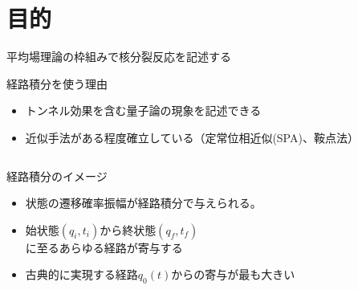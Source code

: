 \documentclass[14pt,aspectratio=169,xcolor=dvipsnames,table,dvipdfmx]{beamer}
\theoremstyle{definition}
\begin{document}
\section{目的}
\begin{frame}{平均場理論の枠組みで核分裂反応を記述する}
  \begin{block}{経路積分を使う理由}
    \begin{itemize}
      \item トンネル効果を含む量子論の現象を記述できる
      \item 近似手法がある程度確立している（定常位相近似(SPA)、鞍点法）
    \end{itemize}
  \end{block}
  \begin{columns}[t]
    \begin{column}{.53\textwidth}
      \vspace{-5mm}
      \begin{exampleblock}{経路積分のイメージ}
        \begin{itemize}
          \item 状態の遷移確率振幅が経路積分で与えられる。
          \item 始状態$(q_i,t_i)$から終状態$(q_f,t_f)$\\に至るあらゆる経路が寄与する
          \item 古典的に実現する経路$q_0(t)$からの寄与が最も大きい
        \end{itemize}
      \end{exampleblock}
    \end{column}
    \begin{column}{.44\textwidth}
    \end{column}
  \end{columns}

\end{frame}
\end{document}
